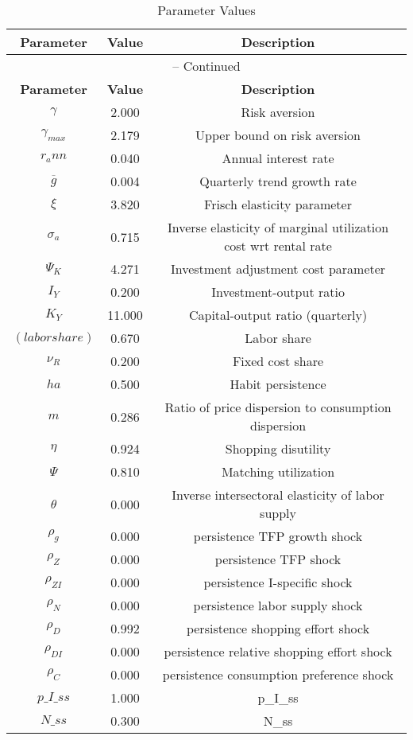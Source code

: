 \begin{center}
\begin{longtable}{ccc}
\caption{Parameter Values}\\%
\toprule%
\multicolumn{1}{c}{\textbf{Parameter}} &
\multicolumn{1}{c}{\textbf{Value}} &
 \multicolumn{1}{c}{\textbf{Description}}\\%
\midrule%
\endfirsthead
\multicolumn{3}{c}{{\tablename} \thetable{} -- Continued}\\%
\midrule%
\multicolumn{1}{c}{\textbf{Parameter}} &
\multicolumn{1}{c}{\textbf{Value}} &
  \multicolumn{1}{c}{\textbf{Description}}\\%
\midrule%
\endhead
${\gamma}$ 	 & 	 2.000 	 & 	 Risk aversion\\
${\gamma_{max}}$ 	 & 	 2.179 	 & 	 Upper bound on risk aversion\\
${r_ann}$ 	 & 	 0.040 	 & 	 Annual interest rate\\
${\overline{g}}$ 	 & 	 0.004 	 & 	 Quarterly trend growth rate\\
$\xi$ 	 & 	 3.820 	 & 	 Frisch elasticity parameter\\
${\sigma_a}$ 	 & 	 0.715 	 & 	 Inverse elasticity of marginal utilization cost wrt rental rate\\
${\Psi_K}$ 	 & 	 4.271 	 & 	 Investment adjustment cost parameter\\
${I_Y}$ 	 & 	 0.200 	 & 	 Investment-output ratio\\
${K_Y}$ 	 & 	 11.000 	 & 	 Capital-output ratio (quarterly)\\
$(labor share)$ 	 & 	 0.670 	 & 	 Labor share\\
${\nu_R}$ 	 & 	 0.200 	 & 	 Fixed cost share\\
${ha}$ 	 & 	 0.500 	 & 	 Habit persistence\\
${m}$ 	 & 	 0.286 	 & 	 Ratio of price dispersion to consumption dispersion\\
${\eta}$ 	 & 	 0.924 	 & 	 Shopping disutility\\
${\Psi}$ 	 & 	 0.810 	 & 	 Matching utilization\\
${\theta}$ 	 & 	 0.000 	 & 	 Inverse intersectoral elasticity of labor supply\\
${\rho_g}$ 	 & 	 0.000 	 & 	 persistence TFP growth shock\\
${\rho_Z}$ 	 & 	 0.000 	 & 	 persistence TFP shock\\
${\rho_{ZI}}$ 	 & 	 0.000 	 & 	 persistence I-specific shock\\
${\rho_N}$ 	 & 	 0.000 	 & 	 persistence labor supply shock\\
${\rho_D}$ 	 & 	 0.992 	 & 	 persistence shopping effort shock\\
${\rho_{DI}}$ 	 & 	 0.000 	 & 	 persistence relative shopping effort shock\\
${\rho_C}$ 	 & 	 0.000 	 & 	 persistence consumption preference shock\\
$p\_I\_ss$ 	 & 	 1.000 	 & 	 p\_I\_ss\\
$N\_ss$ 	 & 	 0.300 	 & 	 N\_ss\\
\bottomrule%
\end{longtable}
\end{center}
